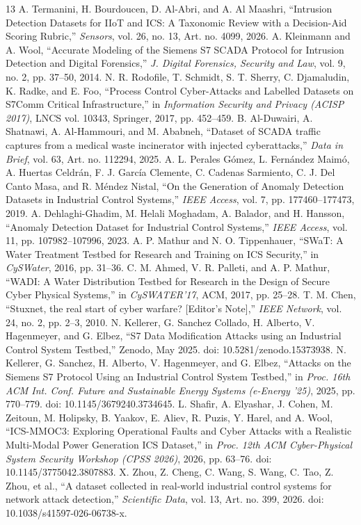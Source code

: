 \documentclass[conference]{IEEEtran}
\begin{document}
\begin{thebibliography}{13}
 A. Termanini, H. Bourdoucen, D. Al-Abri, and A. Al Maashri, ``Intrusion Detection Datasets
for IIoT and ICS: A Taxonomic Review with a Decision-Aid Scoring Rubric,'' \emph{Sensors}, vol. 26, no.
13, Art. no. 4099, 2026.
 A. Kleinmann and A. Wool, ``Accurate Modeling of the Siemens S7 SCADA Protocol for Intrusion
Detection and Digital Forensics,'' \emph{J. Digital Forensics, Security and Law}, vol. 9, no. 2, pp.
37--50, 2014.
 N. R. Rodofile, T. Schmidt, S. T. Sherry, C. Djamaludin, K. Radke, and E. Foo, ``Process
Control Cyber-Attacks and Labelled Datasets on S7Comm Critical Infrastructure,'' in \emph{Information
Security and Privacy (ACISP 2017)}, LNCS vol. 10343, Springer, 2017, pp. 452--459.
 B. Al-Duwairi, A. Shatnawi, A. Al-Hammouri, and M. Ababneh, ``Dataset of SCADA traffic
captures from a medical waste incinerator with injected cyberattacks,'' \emph{Data in Brief}, vol. 63,
Art. no. 112294, 2025.
 A. L. Perales G\'omez, L. Fern\'andez Maim\'o, A. Huertas Celdr\'an, F. J. Garc\'{i}a
Clemente, C. Cadenas Sarmiento, C. J. Del Canto Masa, and R. M\'endez Nistal, ``On the Generation of
Anomaly Detection Datasets in Industrial Control Systems,'' \emph{IEEE Access}, vol. 7, pp.
177460--177473, 2019.
 A. Dehlaghi-Ghadim, M. Helali Moghadam, A. Balador, and H. Hansson, ``Anomaly Detection
Dataset for Industrial Control Systems,'' \emph{IEEE Access}, vol. 11, pp. 107982--107996, 2023.
 A. P. Mathur and N. O. Tippenhauer, ``SWaT: A Water Treatment Testbed for Research and
Training on ICS Security,'' in \emph{CySWater}, 2016, pp. 31--36.
 C. M. Ahmed, V. R. Palleti, and A. P. Mathur, ``WADI: A Water Distribution Testbed for
Research in the Design of Secure Cyber Physical Systems,'' in \emph{CySWATER'17}, ACM, 2017, pp. 25--28.
 T. M. Chen, ``Stuxnet, the real start of cyber warfare? [Editor's Note],'' \emph{IEEE
Network}, vol. 24, no. 2, pp. 2--3, 2010.
 N. Kellerer, G. Sanchez Collado, H. Alberto, V. Hagenmeyer, and G. Elbez, ``S7 Data
Modification Attacks using an Industrial Control System Testbed,'' Zenodo, May 2025. doi:
10.5281/zenodo.15373938.
 N. Kellerer, G. Sanchez, H. Alberto, V. Hagenmeyer, and G. Elbez, ``Attacks on the Siemens
S7 Protocol Using an Industrial Control System Testbed,'' in \emph{Proc. 16th ACM Int. Conf. Future and
Sustainable Energy Systems (e-Energy '25)}, 2025, pp. 770--779. doi: 10.1145/3679240.3734645.
 L. Shafir, A. Elyashar, J. Cohen, M. Zeitoun, M. Holipsky, B. Yaakov, E. Aliev, R. Puzis, Y.
Harel, and A. Wool, ``ICS-MMOC3: Exploring Operational Faults and Cyber Attacks with a Realistic
Multi-Modal Power Generation ICS Dataset,'' in \emph{Proc. 12th ACM Cyber-Physical System Security
Workshop (CPSS 2026)}, 2026, pp. 63--76. doi: 10.1145/3775042.3807883.
 X. Zhou, Z. Cheng, C. Wang, S. Wang, C. Tao, Z. Zhou, et al., ``A dataset collected in
real-world industrial control systems for network attack detection,'' \emph{Scientific Data}, vol. 13,
Art. no. 399, 2026. doi: 10.1038/s41597-026-06738-x.
\end{thebibliography}
\end{document}
